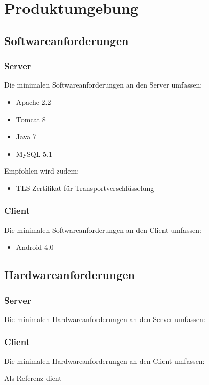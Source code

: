 \section{Produktumgebung}
\subsection{Softwareanforderungen}

\subsubsection{Server}
Die minimalen Softwareanforderungen an den Server umfassen:
\begin{itemize}
\item Apache 2.2
\item Tomcat 8
\item Java 7
\item MySQL 5.1

\end{itemize}

Empfohlen wird zudem:
\begin{itemize}
\item TLS-Zertifikat für Transportverschlüsselung
\end{itemize}

\subsubsection{Client}
Die minimalen Softwareanforderungen an den Client umfassen:
\begin{itemize}
\item Android 4.0

\end{itemize}


\subsection{Hardwareanforderungen}
\subsubsection{Server}
Die minimalen Hardwareanforderungen an den Server umfassen:
\begin{itemize}

\end{itemize}

\subsubsection{Client}
Die minimalen Hardwareanforderungen an den Client umfassen:
\begin{itemize}
\end{itemize}

Als Referenz dient %

